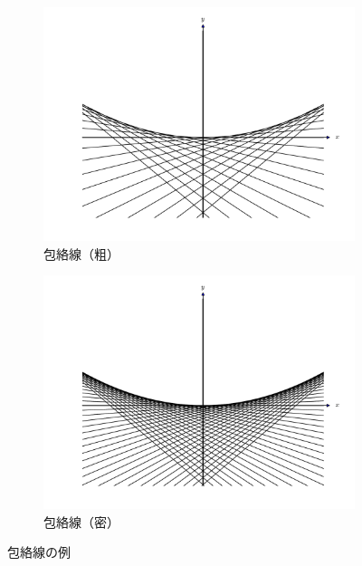 \documentclass[11pt,a4j]{jarticle}
\begin{document}
\begin{figure}
 \centering
 \begin{subfigure}{0.4\columnwidth}
  \centering
  \includegraphics[scale=0.3]{envelope0.pdf}
  \caption{包絡線（粗）}
  \label{fig:envelope0}
 \end{subfigure}
 \begin{subfigure}{0.4\columnwidth}
  \centering
  \includegraphics[scale=0.3]{envelope1.pdf}
  \caption{包絡線（密）}
  \label{fig:envelope1}
 \end{subfigure}
 \caption{包絡線の例}
 \label{fig:envelope}
\end{figure}
\end{document}
